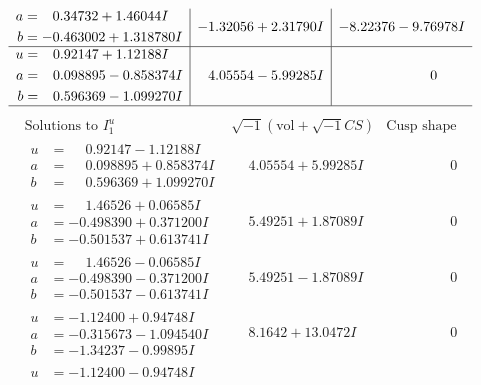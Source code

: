 \documentclass[1p]{elsarticle_modified}
\theoremstyle{definition}
\newcommand{\I}{\sqrt{-1}}
\begin{document}
$$\begin{array}{c|c|c}
\begin{aligned}
a &= \phantom{-}0.34732 + 1.46044 I \\
b &= -0.463002 + 1.318780 I\end{aligned}
 & -1.32056 + 2.31790 I & -8.22376 - 9.76978 I \\ \hline\begin{aligned}
u &= \phantom{-}0.92147 + 1.12188 I \\
a &= \phantom{-}0.098895 - 0.858374 I \\
b &= \phantom{-}0.596369 - 1.099270 I\end{aligned}
 & \phantom{-}4.05554 - 5.99285 I & \phantom{-0.000000 } 0\\
 \hline 
 \end{array}$$\newpage$$\begin{array}{c|c|c}  
\text{Solutions to }I^u_{1}& \I (\text{vol} + \sqrt{-1}CS) & \text{Cusp shape}\\
 \hline 
\begin{aligned}
u &= \phantom{-}0.92147 - 1.12188 I \\
a &= \phantom{-}0.098895 + 0.858374 I \\
b &= \phantom{-}0.596369 + 1.099270 I\end{aligned}
 & \phantom{-}4.05554 + 5.99285 I & \phantom{-0.000000 } 0 \\ \hline\begin{aligned}
u &= \phantom{-}1.46526 + 0.06585 I \\
a &= -0.498390 + 0.371200 I \\
b &= -0.501537 + 0.613741 I\end{aligned}
 & \phantom{-}5.49251 + 1.87089 I & \phantom{-0.000000 } 0 \\ \hline\begin{aligned}
u &= \phantom{-}1.46526 - 0.06585 I \\
a &= -0.498390 - 0.371200 I \\
b &= -0.501537 - 0.613741 I\end{aligned}
 & \phantom{-}5.49251 - 1.87089 I & \phantom{-0.000000 } 0 \\ \hline\begin{aligned}
u &= -1.12400 + 0.94748 I \\
a &= -0.315673 - 1.094540 I \\
b &= -1.34237 - 0.99895 I\end{aligned}
 & \phantom{-}8.1642 + 13.0472 I & \phantom{-0.000000 } 0 \\ \hline\begin{aligned}
u &= -1.12400 - 0.94748 I \\

\end{aligned}
\end{array}$$
\end{document}
